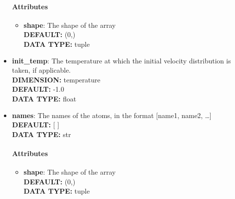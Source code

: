 \begin{itemize}
\paragraph{Attributes}
 \begin{itemize}
\item {\bf shape}:
 The shape of the array
{\\ \bf DEFAULT: }(0,)
{\\ \bf DATA TYPE: }tuple
\end{itemize}
 
\item {\bf init\_temp}:
 The temperature at which the initial velocity distribution is taken, if applicable.
{\\ \bf DIMENSION: }temperature
{\\ \bf DEFAULT: }-1.0
{\\ \bf DATA TYPE: }float
\item {\bf names}:
 The names of the atoms, in the format [name1, name2, \ldots  ]
{\\ \bf DEFAULT: }[ ]
{\\ \bf DATA TYPE: }str
\paragraph{Attributes}
 \begin{itemize}
\item {\bf shape}:
 The shape of the array
{\\ \bf DEFAULT: }(0,)
{\\ \bf DATA TYPE: }tuple
\end{itemize}
 
\end{itemize}
 
